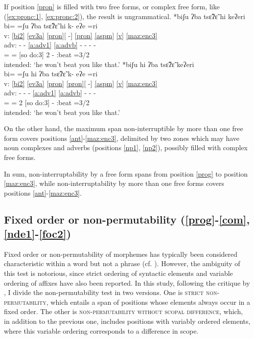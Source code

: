 \documentclass[output=paper]{langscibook}
\begin{document}
If position \ref{pron} is filled with two free forms, or complex free form, like (\ref{ex:pronc:1}, \ref{ex:pronc:2}), the result is ungrammatical.
\ea 
\ea \label{ex:pronc:1}
*bi\4ʃu\3 ʔba\1 tsɛ̃\2\st{}ʔɛ̃\3 \st{}hi\2\3 k\lab{}e\1\st{}ʔe\4ri\2\\
\gllll {} bi\4= =ʃu\3\ff{} ʔba\1 tsɛ̃\2\st{}ʔɛ̃\3\ff{} hi\2\3 k\lab{}- e\1ʔe\4 =ri\2\\
v: \ref{bi2} \ref{ev3a} \ref{pron}[ -] \ref{pron} \ref{aspm} \ref{v} \ref{maz:enc3}\\
adv: - - \ref{a:adv1} \ref{a:advb} - - - -\\
{} \Neg= =\Rep{} [so do:3] \Pronom{}2\Sg{} \Pot- \Pot:beat =3/2\Sg\\
\glt intended: `he won't beat you like that.'
\ex \label{ex:pronc:2}
*bi\4ʃu\3 \st{}hi\2\3 ʔba\1 tsɛ̃\2\st{}ʔɛ̃\3 k\lab{}e\1\st{}ʔe\4ri\2\\
\gllll {} bi\4= =ʃu\3\ff{} hi\2\3 ʔba\1 tsɛ̃\2\st{}ʔɛ̃\3\ff{}  k\lab{}- e\1ʔe\4 =ri\2\\
v: \ref{bi2} \ref{ev3a} \ref{pron} \ref{pron}[ -] \ref{aspm} \ref{v} \ref{maz:enc3}\\
adv: - - - \ref{a:adv1} \ref{a:advb} - - -\\
{} \Neg= =\Rep{} \Pronom{}2\Sg{} [so do:3] \Pot- \Pot:beat =3/2\Sg\\
\glt intended: `he won't beat you like that.'
\z
\z

On the other hand, the maximum span non-interruptible by more than one free form covers positions \ref{ant}-\ref{maz:enc3}, delimited by two zones which may have noun complexes and adverbs (positions \ref{np1}, \ref{np2}), possibly filled with complex free forms.%

In sum, non-interruptability by a free form spans from position \ref{prog} to position \ref{maz:enc3}, while non-interruptability by more than one free forms covers positions \ref{ant}-\ref{maz:enc3}.

\subsection{Fixed order or non-permutability (\ref{prog}-\ref{com}, \ref{nde1}-\ref{foc2})}
Fixed order or non-permutability of morphemes has typically been considered characteristic within a word but not a phrase (cf. \citealt[19--20]{dixonaikhenvald02}). However, the ambiguity of this test is notorious, since strict ordering of syntactic elements and variable ordering of affixes have also been reported.
In this study, following the critique by \citet[\S5.4]{tallman2021constituency}, I divide the non-permutability test in two versions. One is \textsc{strict non-permutability}, which entails a span of positions whose elements always occur in a fixed order. The other is \textsc{non-permutability without scopal difference}, which, in addition to the previous one, includes positions with variably ordered elements, where this variable ordering corresponds to a difference in scope.
\end{document}
